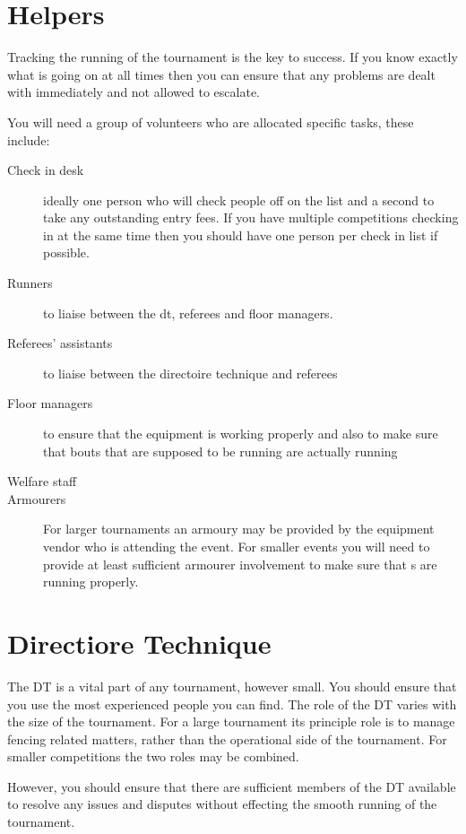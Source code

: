 \documentclass[a4paper,11pt]{memoir}
\begin{document}
\section{Helpers}

Tracking the running of the tournament is the key to success. If you know exactly what is going on at all times then you can ensure that any problems are dealt with immediately and not allowed to escalate. 

You will need a group of volunteers who are allocated specific tasks, these include:

\begin{description}
 \item[Check in desk] ideally one person who will check people off on the list and a second to take any outstanding entry fees. If you have multiple competitions checking in at the same time then you should have one person per check in list if possible.
 \item[Runners] to liaise between the \gls{dt}, referees and floor managers. 
 \item[Referees' assistants] to liaise between the \gls{directoire technique} and referees
 \item[Floor managers] to ensure that the equipment is working properly and also to make sure that bouts that are supposed to be running are actually running
 \item[Welfare staff]
 \item[Armourers] For larger tournaments an armoury may be provided by the equipment vendor who is attending the event. For smaller events you will need to provide at least sufficient armourer involvement to make sure that s are running properly.
\end{description}

\section{Directiore Technique}

The DT is a vital part of any tournament, however small. You should ensure that you use the most experienced people you can find.
The role of the DT varies with the size of the tournament. For a large tournament its principle role is to manage fencing related matters, rather than the operational side of the tournament. For smaller competitions the two roles may be combined.

However, you should ensure that there are sufficient members of the DT available to resolve any issues and disputes without effecting the smooth running of the tournament.
\end{document}
